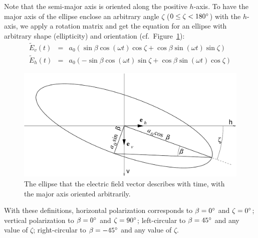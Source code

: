 Note that the semi-major axis is oriented along the positive $h$-axis.
To have the major axis of the ellipse enclose an arbitrary angle
$\zeta$ ($0 \leq \zeta < 180^\circ$) with the $h$-axis, we apply a
rotation matrix and get the equation for an ellipse with arbitrary
shape (ellipticity) and orientation (cf.\
Figure~\ref{fig:polarization:ellipse_arbitrary})\label{def:orientation-angle}:
\begin{eqnarray}
  \label{eq:polarization:ellipse_rotated1}
 \tilde{E}_v (t) &=&  a_0(  \sin\beta \cos(\omega t) \cos\zeta
                           +\cos\beta \sin(\omega t) \sin\zeta )\\
  \label{eq:polarization:ellipse_rotated2}
 \tilde{E}_h (t) &=&  a_0( -\sin\beta \cos(\omega t) \sin\zeta
                           +\cos\beta \sin(\omega t) \cos\zeta )
\end{eqnarray}
%
\begin{figure}[!ht]
 \begin{center}
  \begin{minipage}[c]{0.9\textwidth}
   \begin{center}
    \includegraphics*[width=0.9\hsize]{Figs/polarization/pol_ellipse_arbitrary}
   \end{center}
  \end{minipage}
  \begin{minipage}[c]{0.9\textwidth}
   \caption{The ellipse that the electric field vector describes with
     time, with the major axis oriented arbitrarily.}
   \label{fig:polarization:ellipse_arbitrary}
  \end{minipage}
 \end{center}
\end{figure}   
With these definitions, horizontal polarization corresponds to
$\beta=0^\circ$ and $\zeta=0^\circ$; vertical polarization to 
$\beta=0^\circ$ and $\zeta=90^\circ$; left-circular to 
$\beta=45^\circ$ and any value of $\zeta$; right-circular to 
$\beta=-45^\circ$ and any value of $\zeta$.
    
